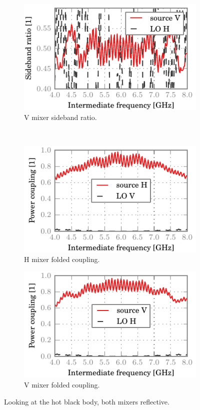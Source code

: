 \begin{figure}[hbtp]
    \begin{subfigure}[b]{.5\textwidth}
        \includegraphics{chapter_3/15_everything_v_sbr}%
        \caption{V mixer sideband ratio.}
    \end{subfigure}%
    \\
    \begin{subfigure}[b]{.5\textwidth}
        \includegraphics{chapter_3/15_everything_h_ssb}%
        \caption{H mixer folded coupling.}
    \end{subfigure}%
    \begin{subfigure}[b]{.5\textwidth}
        \includegraphics{chapter_3/15_everything_v_ssb}%
        \caption{V mixer folded coupling.}
    \end{subfigure}%
    \caption{Looking at the hot black body, both mixers reflective.}
    \label{fig:15_everything}
\end{figure}

